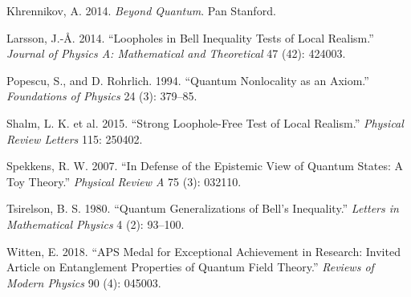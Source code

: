 \documentclass[
  11pt]{article}
\newlength{\cslhangindent}
\newenvironment{CSLReferences}[2] %
 {\begin{list}{}{%
  \setlength{\itemindent}{0pt}
  \setlength{\leftmargin}{0pt}
  \setlength{\parsep}{0pt}
  \ifodd #1
   \setlength{\leftmargin}{\cslhangindent}
   \setlength{\itemindent}{-1\cslhangindent}
  \fi
  \setlength{\itemsep}{#2\baselineskip}}}
 {\end{list}}
\begin{document}
\begin{CSLReferences}{1}{0}
Khrennikov, A. 2014. \emph{Beyond Quantum}. Pan Stanford.

Larsson, J.-Å. 2014. {``Loopholes in {Bell} Inequality Tests of Local
Realism.''} \emph{Journal of Physics A: Mathematical and Theoretical} 47
(42): 424003.

Popescu, S., and D. Rohrlich. 1994. {``Quantum Nonlocality as an
Axiom.''} \emph{Foundations of Physics} 24 (3): 379--85.

Shalm, L. K. et al. 2015. {``Strong Loophole-Free Test of Local
Realism.''} \emph{Physical Review Letters} 115: 250402.

Spekkens, R. W. 2007. {``In Defense of the Epistemic View of Quantum
States: A Toy Theory.''} \emph{Physical Review A} 75 (3): 032110.

Tsirelson, B. S. 1980. {``Quantum Generalizations of {Bell's}
Inequality.''} \emph{Letters in Mathematical Physics} 4 (2): 93--100.

Witten, E. 2018. {``{APS} Medal for Exceptional Achievement in Research:
Invited Article on Entanglement Properties of Quantum Field Theory.''}
\emph{Reviews of Modern Physics} 90 (4): 045003.

\end{CSLReferences}
\end{document}
